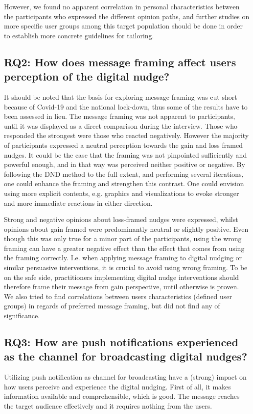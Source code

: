 However, we found no apparent correlation in personal characteristics between the participants who expressed the different opinion paths, and further studies on more specific user groups among this target population should be done in order to establish more concrete guidelines for tailoring. 

\subsection{RQ2: How does message framing affect users perception of the digital nudge?}

It should be noted that the basis for exploring message framing was cut short because of Covid-19 and the national lock-down, thus some of the results have to been assessed in lieu. The message framing was not apparent to participants, until it was displayed as a direct comparison during the interview. Those who responded the strongest were those who reacted negatively. However the majority of participants expressed a neutral perception towards the gain and loss framed nudges. It could be the case that the framing was not pinpointed sufficiently and powerful enough, and in that way was perceived neither positive or negative. By following the DND method to the full extent, and performing several iterations, one could enhance the framing and strengthen this contrast. One could envision using more explicit contents, e.g. graphics and visualizations to evoke stronger and more immediate reactions in either direction. 

Strong and negative opinions about loss-framed nudges were expressed, whilst opinions about gain framed were predominantly neutral or slightly positive. Even though this was only true for a minor part of the participants, using the wrong framing can have a greater negative effect than the effect that comes from using the framing correctly. I.e. when applying message framing to digital nudging or similar persuasive interventions, it is crucial to avoid using wrong framing. To be on the safe side, practitioners implementing digital nudge interventions should therefore frame their message from gain perspective, until otherwise is proven. We also tried to find correlations between users characteristics (defined user groups) in regards of preferred message framing, but did not find any of significance. 

\subsection{RQ3: How are push notifications experienced as the channel for broadcasting digital nudges?}
Utilizing push notification as channel for broadcasting have a (strong) impact on how users perceive and experience the digital nudging. First of all, it makes information available and comprehensible, which is good. The message reaches the target audience effectively and it requires nothing from the users.

